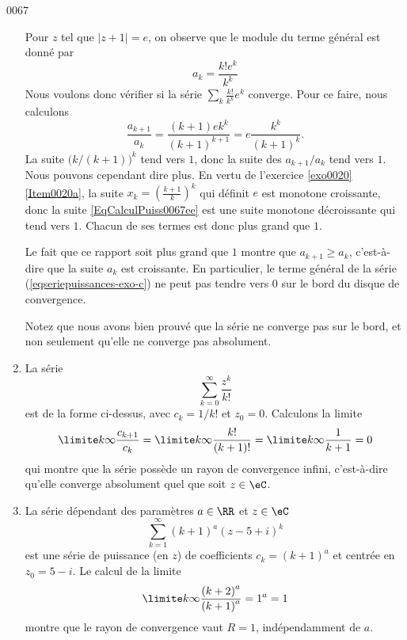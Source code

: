 \begin{corrige}{0067}
\begin{enumerate}
Pour $z$ tel que $| z+1 | = e$, on observe que le module du terme général est donné par
\begin{equation}
a_k = \frac{k! e^k}{k^k}
\end{equation}
Nous voulons donc vérifier si la série $\sum_k\frac{ k! }{ k^k }e^k$ converge. Pour ce faire, nous calculons
\begin{equation}\label{EqCalculPuiss0067ee}
	\frac{a_{k+1}}{a_k}=\frac{ (k+1)ek^k }{ (k+1)^{k+1} }=e\frac{ k^k }{ (k+1)^k }.
\end{equation}
La suite $\big( k/(k+1) \big)^k$ tend vers $1$, donc la suite des $a_{k+1}/a_k$ tend vers $1$. Nous pouvons cependant dire plus. En vertu de l'exercice \ref{exo0020}\ref{Item0020a}, la suite $x_k=\left( \frac{ k+1 }{ k } \right)^k$ qui définit $e$ est monotone croissante, donc la suite \eqref{EqCalculPuiss0067ee} est une suite monotone décroissante qui tend vers $1$. Chacun de ses termes est donc plus grand que $1$.


Le fait que ce rapport soit plus grand que $1$ montre que $a_{k+1} \geq a_k$, c'est-à-dire que la suite $a_k$ est croissante. En particulier, le terme général de la série (\ref{eqseriepuissances-exo-c}) ne peut pas tendre vers $0$ sur le bord du disque de convergence.

Notez que nous avons bien prouvé que la série ne converge pas sur le bord, et non seulement qu'elle ne converge pas absolument.

\item 
La série
\begin{equation*}
	\sum_{k=0}^\infty \frac{z^k}{k!}
\end{equation*}
est de la forme ci-dessus, avec $c_k = 1/k!$ et $z_0 = 0$. Calculons la limite
\begin{equation*}
\limite k \infty \frac{c_{k+1}}{c_k} = \limite k\infty
\frac{k!}{(k+1)!} = \limite k\infty \frac{1}{k+1} = 0
\end{equation*}
qui montre que la série possède un rayon de convergence infini,
c'est-à-dire qu'elle converge absolument quel que soit $z \in \eC$.

\item La série dépendant des paramètres $a \in \RR$ et $z \in \eC$
\begin{equation*}
\sum_{k=1}^\infty {(k+1)}^a {(z- 5 + i)}^k
\end{equation*}
est une série de puissance (en $z$) de coefficients $c_k =
{(k+1)}^a$ et centrée en $z_0 = 5 - i$. Le calcul de la limite
\begin{equation*}
\limite k\infty \frac{{(k+2)}^a}{{(k+1)}^a} = 1^a = 1
\end{equation*}
montre que le rayon de convergence vaut $R = 1$, indépendamment de
$a$.


\end{enumerate}
\end{corrige}
